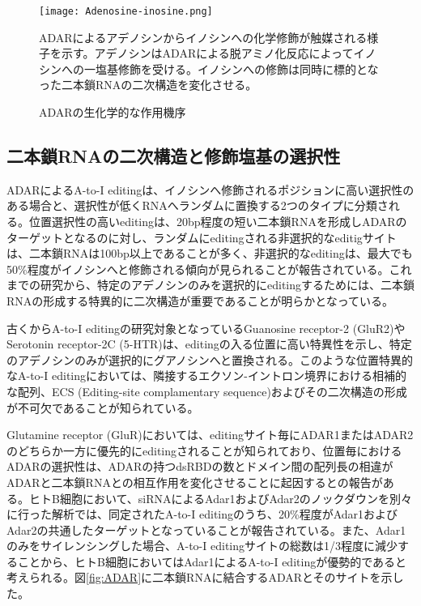 \begin{figure}[!htbp]
	\begin{center}
		\texttt{[image: Adenosine-inosine.png]}
	\end{center}
	\caption{ADARの生化学的な作用機序}
	\begin{flushleft}
		\small{ADARによるアデノシンからイノシンへの化学修飾が触媒される様子を示す。アデノシンはADARによる脱アミノ化反応によってイノシンへの一塩基修飾を受ける。イノシンへの修飾は同時に標的となった二本鎖RNAの二次構造を変化させる。}
	\end{flushleft}
	\label{fig:Chemical_reaction}
\end{figure}

\subsection{二本鎖RNAの二次構造と修飾塩基の選択性}
ADARによるA-to-I editingは、イノシンへ修飾されるポジションに高い選択性のある場合と、選択性が低くRNAへランダムに置換する2つのタイプに分類される。位置選択性の高いeditingは、20bp程度の短い二本鎖RNAを形成しADARのターゲットとなるのに対し、ランダムにeditingされる非選択的なeditigサイトは、二本鎖RNAは100bp以上であることが多く、非選択的なeditingは、最大でも50\%程度がイノシンへと修飾される傾向が見られることが報告されている。これまでの研究から、特定のアデノシンのみを選択的にeditingするためには、二本鎖RNAの形成する特異的に二次構造が重要であることが明らかとなっている。
\par
古くからA-to-I editingの研究対象となっているGuanosine receptor-2 (GluR2)やSerotonin receptor-2C (5-HTR)は、editingの入る位置に高い特異性を示し、特定のアデノシンのみが選択的にグアノシンへと置換される。このような位置特異的なA-to-I editingにおいては、隣接するエクソン-イントロン境界における相補的な配列、ECS (Editing-site complamentary sequence)およびその二次構造の形成が不可欠であることが知られている。
\par
Glutamine receptor (GluR)においては、editingサイト毎にADAR1またはADAR2のどちらか一方に優先的にeditingされることが知られており、位置毎におけるADARの選択性は、ADARの持つdsRBDの数とドメイン間の配列長の相違がADARと二本鎖RNAとの相互作用を変化させることに起因するとの報告がある。ヒトB細胞において、siRNAによるAdar1およびAdar2のノックダウンを別々に行った解析では、同定されたA-to-I editingのうち、20\%程度がAdar1およびAdar2の共通したターゲットとなっていることが報告されている。また、Adar1のみをサイレンシングした場合、A-to-I editingサイトの総数は1/3程度に減少することから、ヒトB細胞においてはAdar1によるA-to-I editingが優勢的であると考えられる。図\ref{fig:ADAR}に二本鎖RNAに結合するADARとそのサイトを示した。
